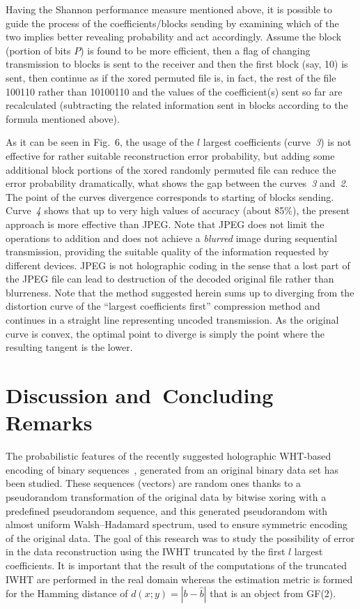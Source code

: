 \begin{multicols}{2}
Having the Shannon performance measure mentioned above, it is possible to guide the process of 
the coefficients/blocks sending by examining which of the two implies better revealing 
probability and act accordingly. Assume the block (portion of bits $P$) is found to be 
more efficient, then  a flag of changing transmission to blocks is sent to the receiver 
and then the first block (say, 10) is sent, then continue as if the xored permuted file 
is, in fact, the rest of the file 100110 rather than 10100110  and the values of the 
coefficient(s) sent so far are  recalculated (subtracting the related information sent 
in blocks according to the formula mentioned above).

As it can be seen in Fig.~6, the usage of the $l$ largest coefficients (curve~\textit{3}) 
is not effective for rather suitable reconstruction 
error probability, but adding some additional block portions of the xored randomly 
permuted file can reduce the error probability dramatically, what shows  the gap 
between the curves~\textit{3} and~\textit{2}. The point of the curves
divergence corresponds to starting of blocks sending.
Curve~\textit{4} shows that up to very high values of accuracy (about 85\%), 
the present approach is more effective than JPEG.
Note that  JPEG does not limit the operations to addition and does not achieve 
a {\it blurred} image during sequential transmission, providing the suitable
quality of the information requested by different devices. JPEG  is not 
holographic coding in the sense that a lost part
of the JPEG file can lead to destruction of the decoded original file rather than blurreness.
Note that the method suggested herein
sums up to diverging from the distortion curve of the ``largest coefficients first'' 
compression method and continues  in a straight line representing uncoded transmission. 
As the original curve is convex, the optimal point to diverge is simply the point where 
the resulting  tangent is the lower.


\section{Discussion and~Concluding Remarks}

\noindent
The probabilistic features of the recently suggested holographic 
WHT-based encoding of binary sequences~\cite{2-fr, 8-fr}, 
generated from an original binary data set has been studied. 
These sequences (vectors) are random ones 
thanks to a pseudorandom transformation of the original data by bitwise xoring with 
a predefined pseudorandom sequence, and this generated  pseudorandom with almost 
uniform Walsh--Hadamard spectrum, used to ensure symmetric encoding of the original 
data. The goal of this research was to study the possibility of error in
the data reconstruction using the IWHT
truncated by the first $l$ largest coefficients. It is important 
that the result of the computations of the  truncated IWHT are
performed in the real domain whereas the estimation metric is formed for 
the Hamming distance of $d(x; y) =| b-\hat b | $ that is an object from GF(2).


\end{multicols}
